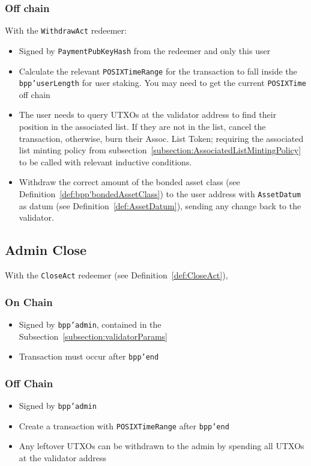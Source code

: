 \documentclass[10pt, a4paper]{article}
\theoremstyle{definition}
\begin{document}
\subsubsection{Off chain}\label{subsection:UserWithdrawOffchain}
With the \texttt{WithdrawAct} redeemer:
\begin{itemize}
\item{Signed by \texttt{PaymentPubKeyHash} from the redeemer and only this user}
\item{Calculate the relevant \texttt{POSIXTimeRange} for the transaction to fall inside the \texttt{bpp'userLength} for user staking. You may need to get the current \texttt{POSIXTime} off chain}
\item{The user needs to query UTXOs at the validator address to find their position in the associated list. If they are not in the list, cancel the transaction, otherwise, burn their Assoc. List Token; requiring the associated list minting policy from subsection~\ref{subsection:AssociatedListMintingPolicy} to be called with relevant inductive conditions.}
\item{Withdraw the correct amount of the bonded asset class (see Definition~\ref{def:bpp'bondedAssetClass}) to the user address with \texttt{AssetDatum} as datum (see Definition~\ref{def:AssetDatum}), sending any change back to the validator.}
\end{itemize}
\subsection{Admin Close}
With the \texttt{CloseAct} redeemer (see Definition~\ref{def:CloseAct}), 

\subsubsection{On Chain}
\begin{itemize}
\item{Signed by \texttt{bpp'admin}, contained in the Subsection~\ref{subsection:validatorParams}}
\item{Transaction must occur after \texttt{bpp'end}}
\end{itemize}

\subsubsection{Off Chain}
\begin{itemize}
\item{Signed by \texttt{bpp'admin}}
\item{Create a transaction with \texttt{POSIXTimeRange} after \texttt{bpp'end}}
\item{Any leftover UTXOs can be withdrawn to the admin by spending all UTXOs at the validator address}
\end{itemize}
\end{document}
